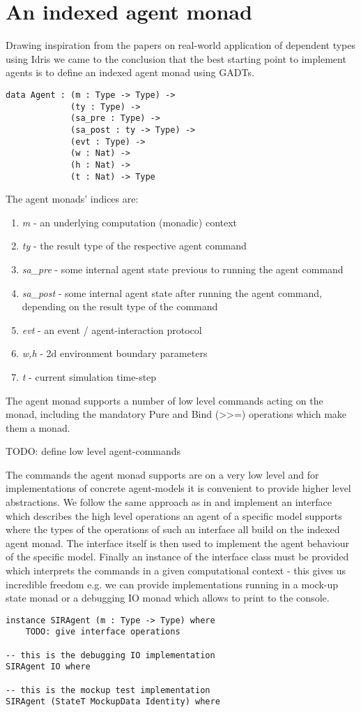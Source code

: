 \section{An indexed agent monad}
Drawing inspiration from the papers on real-world application of dependent types using Idris we came to the conclusion that the best starting point to implement agents is to define an indexed agent monad using GADTs. 

\begin{verbatim}
data Agent : (m : Type -> Type) -> 
             (ty : Type) ->
             (sa_pre : Type) -> 
             (sa_post : ty -> Type) ->
             (evt : Type) ->
             (w : Nat) -> 
             (h : Nat) -> 
             (t : Nat) -> Type 
\end{verbatim}

The agent monads' indices are:
\begin{enumerate}
	\item \textit{m} - an underlying computation (monadic) context
	\item \textit{ty} - the result type of the respective agent command
	\item \textit{sa\_pre} - some internal agent state previous to running the agent command
	\item \textit{sa\_post} - some internal agent state after running the agent command, depending on the result type of the command
	\item \textit{evt} - an event / agent-interaction protocol
	\item \textit{w,h} - 2d environment boundary parameters
	\item \textit{t} - current simulation time-step
\end{enumerate}

The agent monad supports a number of low level commands acting on the monad, including the mandatory Pure and Bind (>>=) operations which make them a monad.

TODO: define low level agent-commands

The commands the agent monad supports are on a very low level and for implementations of concrete agent-models it is convenient to provide higher level abstractions. We follow the same approach as in \cite{brady_state_2016} and implement an interface which describes the high level operations an agent of a specific model supports where the types of the operations of such an interface all build on the indexed agent monad. The interface itself is then used to implement the agent behaviour of the specific model. Finally an instance of the interface class must be provided which interprets the commands in a given computational context - this gives us incredible freedom e.g. we can provide implementations running in a mock-up state monad or a debugging IO monad which allows to print to the console.

\begin{verbatim}
instance SIRAgent (m : Type -> Type) where
	TODO: give interface operations
	
-- this is the debugging IO implementation
SIRAgent IO where
	
-- this is the mockup test implementation
SIRAgent (StateT MockupData Identity) where
\end{verbatim}
